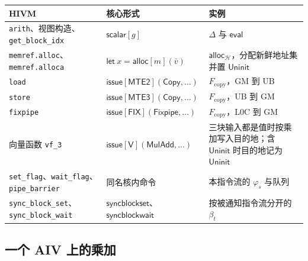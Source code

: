 \documentclass[UTF8,a4paper,11pt,fontset=fandol]{ctexart}
\newcommand{\kw}[1]{\ensuremath{\mathsf{#1}}}
\begin{document}
\begin{center}
\begin{tabularx}{\linewidth}{@{}llY@{}}
\toprule
HIVM & 核心形式 & 实例 \\
\midrule
\texttt{arith}、视图构造、\texttt{get\_block\_idx}
  & $\kw{scalar}[g]$
  & $\Delta$ 与 $\mathsf{eval}$ \\
\texttt{memref.alloc}、\texttt{memref.alloca}
  & $\kw{let}\ x=\kw{alloc}[m](\bar v)$
  & $\mathsf{alloc}_{\mathcal H}$，分配新鲜地址集并置 $\mathsf{Uninit}$ \\
\texttt{load}
  & $\kw{issue}[\mathsf{MTE2}](\kw{Copy},\ldots)$
  & $F_{\mathrm{copy}}$，GM 到 UB \\
\texttt{store}
  & $\kw{issue}[\mathsf{MTE3}](\kw{Copy},\ldots)$
  & $F_{\mathrm{copy}}$，UB 到 GM \\
\texttt{fixpipe}
  & $\kw{issue}[\mathsf{FIX}](\kw{Fixpipe},\ldots)$
  & $F_{\mathrm{copy}}$，L0C 到 GM \\
向量函数 \texttt{vf\_3}
  & $\kw{issue}[\mathsf{V}](\kw{MulAdd},\ldots)$
  & 三块输入都是值时按乘加写入目的地；含 $\mathsf{Uninit}$ 时目的地记为 $\mathsf{Uninit}$ \\
\texttt{set\_flag}、\texttt{wait\_flag}、\texttt{pipe\_barrier}
  & 同名核内命令
  & 本指令流的 $\varphi_s$ 与队列 \\
\texttt{sync\_block\_set}、\texttt{sync\_block\_wait}
  & $\kw{syncblockset}$、$\kw{syncblockwait}$
  & 按被通知指令流分开的 $\beta_t$ \\
\bottomrule
\end{tabularx}
\end{center}

\subsection{一个 AIV 上的乘加}
\end{document}
